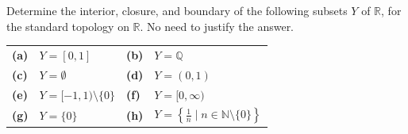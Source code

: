 
\begin{exercise}
\label{ex:boundary_interior_closure_drill}
Determine the interior, closure, and boundary of the following subsets $Y$ of $\mathbb{R}$, for
the standard topology on $\mathbb{R}$. No need to justify the answer.
\begin{center}
\begin{tabular}{ll ll}
\textbf{(a)} & $Y = [0,1]$ & \textbf{(b)} & $Y = \mathbb{Q}$ \\
\textbf{(c)} & $Y = \emptyset$ & \textbf{(d)} & $Y = (0,1)$ \\
\textbf{(e)} & $Y = [-1,1) \setminus \{0\}$ & \textbf{(f)} & $Y = [0,\infty)$ \\
\textbf{(g)} & $Y = \{0\}$ & \textbf{(h)} &
  $Y = \left\{\tfrac{1}{n} \mid n \in \mathbb{N}\setminus\{0\}\right\}$
\end{tabular}
\end{center}
\end{exercise}
